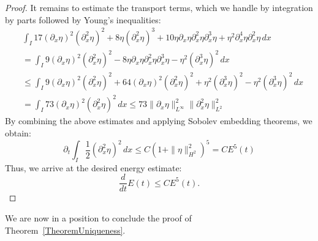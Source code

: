 \documentclass[12pt]{amsart}
\newcommand{\D}{\,d}
\begin{document}
\begin{proof}
	It remains to estimate the transport terms, which we handle by integration by parts followed by Young’s inequalities:
	\begin{align*}
		&\int_I 17(\partial_x \eta)^2(\partial_x^2\eta)^2+8\eta(\partial_x^2\eta)^3+10\eta\partial_x\eta\partial^2_x\eta\partial_x^3\eta+\eta^2\partial_x^4\eta\partial^2_x\eta\D x\\
		&=\int_I 9(\partial_x \eta)^2(\partial_x^2\eta)^2-8\eta\partial_x\eta\partial^2_x\eta\partial_x^3\eta-\eta^2(\partial_x^3\eta)^2\D x	\\
		&\leq\int_I 9(\partial_x\eta)^2(\partial_x^2\eta)^2+64(\partial_x\eta)^2(\partial^2_x\eta)^2+\eta^2(\partial_x^3\eta)^2-\eta^2(\partial_x^3\eta)^2\D x\\
		&=\int_I 73(\partial_x\eta)^2(\partial_x^2\eta)^2\D x\leq73\|\partial_x\eta\|^2_{L^\infty}\|\partial_x^2\eta\|^2_{L^2}
	\end{align*}
	By combining the above estimates and applying Sobolev embedding theorems, we obtain:
	$$\partial_t \int_I\frac{1}{2}(\partial^2_x\eta)^2 \D x\leq C(1+\|\eta\|^2_{H^2})^5=CE^5(t)$$
	Thus, we arrive at the desired energy estimate:
	$$\frac{d}{dt}E(t)\leq C E^5(t).$$
\end{proof}
We are now in a position to conclude the proof of Theorem~\ref{TheoremUniqueness}.
\end{document}
